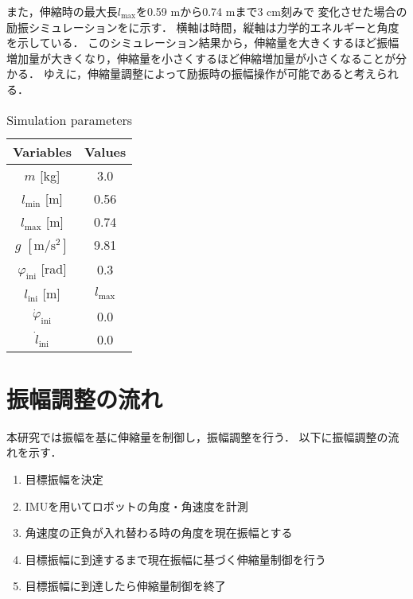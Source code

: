           また，伸縮時の最大長$l_{\mathrm{max}}$を0.59 mから0.74 mまで3 cm刻みで
          変化させた場合の励振シミュレーションをに示す．
          横軸は時間，縦軸は力学的エネルギーと角度を示している．
          このシミュレーション結果から，伸縮量を大きくするほど振幅増加量が大きくなり，伸縮量を小さくするほど伸縮増加量が小さくなることが分かる．
          ゆえに，伸縮量調整によって励振時の振幅操作が可能であると考えられる．
          \begin{table}[tb]
            \begin{center}
              \caption{Simulation parameters}
              \vspace{2mm}
              \begin{tabular}{c|c}
                \hline
                Variables & Values \\
                \hline
                $m$ [kg] & 3.0 \\
                $l_{\mathrm{min}}$ [m] & 0.56 \\
                $l_{\mathrm{max}}$ [m] & 0.74 \\
                $g$ $\mathrm{[m/s^2]}$ & 9.81 \\
                $\varphi_{\mathrm{ini}}$ [rad] & 0.3 \\
                $l_{\mathrm{ini}}$ [m]& $l_{\mathrm{max}}$ \\
                $\dot{\varphi}_{\mathrm{ini}}$ & 0.0 \\
                $\dot{l}_{\mathrm{ini}}$ & 0.0 \\
                \hline
              \end{tabular}
            \end{center}
          \end{table}
        
          
        \newpage
        \section{振幅調整の流れ}

          本研究では振幅を基に伸縮量を制御し，振幅調整を行う．
          以下に振幅調整の流れを示す．
          \begin{enumerate}
            \item 目標振幅を決定
            \item IMUを用いてロボットの角度・角速度を計測
            \item 角速度の正負が入れ替わる時の角度を現在振幅とする
            \item 目標振幅に到達するまで現在振幅に基づく伸縮量制御を行う
            \item 目標振幅に到達したら伸縮量制御を終了
          \end{enumerate}


